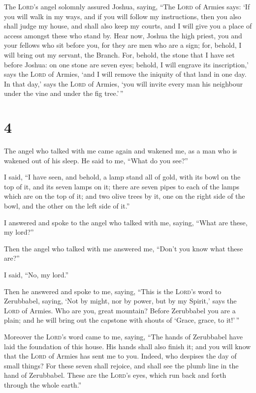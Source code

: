  The \textsc{Lord}'s angel solomnly assured Joshua,
saying,  ``The \textsc{Lord} of Armies says: `If you will
walk in my ways, and if you will follow my instructions, then you also
shall judge my house, and shall also keep my courts, and I will give you
a place of access amongst these who stand by.  Hear now,
Joshua the high priest, you and your fellows who sit before you, for
they are men who are a sign; for, behold, I will bring out my servant,
the Branch.  For, behold, the stone that I have set before
Joshua: on one stone are seven eyes; behold, I will engrave its
inscription,' says the \textsc{Lord} of Armies, `and I will remove the
iniquity of that land in one day.  In that day,' says the
\textsc{Lord} of Armies, `you will invite every man his neighbour under
the vine and under the fig tree.'\,''

\hypertarget{section-3}{%
\section{4}\label{section-3}}

 The angel who talked with me came again and wakened me,
as a man who is wakened out of his sleep.  He said to me,
``What do you see?''

I said, ``I have seen, and behold, a lamp stand all of gold, with its
bowl on the top of it, and its seven lamps on it; there are seven pipes
to each of the lamps which are on the top of it;  and two
olive trees by it, one on the right side of the bowl, and the other on
the left side of it.''

 I answered and spoke to the angel who talked with me,
saying, ``What are these, my lord?''

 Then the angel who talked with me answered me, ``Don't
you know what these are?''

I said, ``No, my lord.''

 Then he answered and spoke to me, saying, ``This is the
\textsc{Lord}'s word to Zerubbabel, saying, `Not by might, nor by power,
but by my Spirit,' says the \textsc{Lord} of Armies.  Who
are you, great mountain? Before Zerubbabel you are a plain; and he will
bring out the capstone with shouts of `Grace, grace, to it!'\,''

 Moreover the \textsc{Lord}'s word came to me, saying,
 ``The hands of Zerubbabel have laid the foundation of
this house. His hands shall also finish it; and you will know that the
\textsc{Lord} of Armies has sent me to you.  Indeed, who
despises the day of small things? For these seven shall rejoice, and
shall see the plumb line in the hand of Zerubbabel. These are the
\textsc{Lord}'s eyes, which run back and forth through the whole
earth.''

